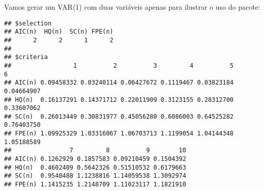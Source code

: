 \documentclass[]{book}
\newenvironment{Shaded}{\begin{snugshade}}{\end{snugshade}}
\newcommand{\KeywordTok}[1]{\textcolor[rgb]{0.13,0.29,0.53}{\textbf{#1}}}
\newcommand{\DataTypeTok}[1]{\textcolor[rgb]{0.13,0.29,0.53}{#1}}
\newcommand{\DecValTok}[1]{\textcolor[rgb]{0.00,0.00,0.81}{#1}}
\newcommand{\FloatTok}[1]{\textcolor[rgb]{0.00,0.00,0.81}{#1}}
\newcommand{\StringTok}[1]{\textcolor[rgb]{0.31,0.60,0.02}{#1}}
\newcommand{\CommentTok}[1]{\textcolor[rgb]{0.56,0.35,0.01}{\textit{#1}}}
\newcommand{\ControlFlowTok}[1]{\textcolor[rgb]{0.13,0.29,0.53}{\textbf{#1}}}
\newcommand{\OperatorTok}[1]{\textcolor[rgb]{0.81,0.36,0.00}{\textbf{#1}}}
\newcommand{\NormalTok}[1]{#1}
\begin{document}
Vamos gerar um VAR(1) com duas variáveis apenas para ilustrar o uso do
pacote:

\begin{Shaded}
\end{Shaded}

\begin{verbatim}
## $selection
## AIC(n)  HQ(n)  SC(n) FPE(n) 
##      2      2      1      2 
## 
## $criteria
##                 1          2          3         4          5          6
## AIC(n) 0.09458332 0.03240114 0.06427672 0.1119467 0.03823184 0.04664907
## HQ(n)  0.16137291 0.14371712 0.22011909 0.3123155 0.28312700 0.33607062
## SC(n)  0.26013449 0.30831977 0.45056280 0.6086003 0.64525282 0.76403750
## FPE(n) 1.09925329 1.03316067 1.06703713 1.1199054 1.04144348 1.05188589
##                7         8          9        10
## AIC(n) 0.1262929 0.1857583 0.09210459 0.1504392
## HQ(n)  0.4602409 0.5642326 0.51510532 0.6179663
## SC(n)  0.9540488 1.1238816 1.14059538 1.3092974
## FPE(n) 1.1415235 1.2148709 1.11023117 1.1821910
\end{verbatim}
\end{document}
